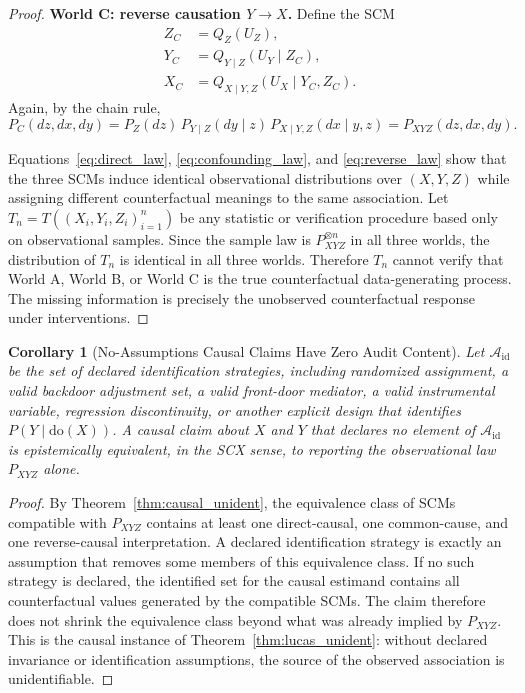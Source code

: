 \documentclass[11pt,a4paper]{article}
\newtheorem{corollary}[theorem]{Corollary}
\theoremstyle{definition}
\begin{document}
\begin{proof}
\medskip\noindent
\textbf{World C: reverse causation $Y \to X$.}
Define the SCM
\begin{align}
    Z_C &= Q_Z(U_Z), \nonumber\\
    Y_C &= Q_{Y\mid Z}(U_Y \mid Z_C), \nonumber\\
    X_C &= Q_{X\mid Y,Z}(U_X \mid Y_C,Z_C).
    \label{eq:scm_reverse}
\end{align}
Again, by the chain rule,
\begin{equation}
    P_C(dz,dx,dy)
    = P_Z(dz)\,P_{Y\mid Z}(dy\mid z)\,P_{X\mid Y,Z}(dx\mid y,z)
    = P_{XYZ}(dz,dx,dy).
    \label{eq:reverse_law}
\end{equation}

Equations~\eqref{eq:direct_law}, \eqref{eq:confounding_law}, and
\eqref{eq:reverse_law} show that the three SCMs induce identical
observational distributions over $(X,Y,Z)$ while assigning different
counterfactual meanings to the same association.  Let
$T_n = T((X_i,Y_i,Z_i)_{i=1}^n)$ be any statistic or verification
procedure based only on observational samples.  Since the sample law is
$P_{XYZ}^{\otimes n}$ in all three worlds, the distribution of $T_n$ is
identical in all three worlds.  Therefore $T_n$ cannot verify that World A,
World B, or World C is the true counterfactual data-generating process.
The missing information is precisely the unobserved counterfactual
response under interventions.
\end{proof}

\begin{corollary}[No-Assumptions Causal Claims Have Zero Audit Content]
\label{cor:no_assumption_causal_claim}
Let $\mathcal{A}_{\mathrm{id}}$ be the set of declared identification
strategies, including randomized assignment, a valid backdoor adjustment
set, a valid front-door mediator, a valid instrumental variable, regression
discontinuity, or another explicit design that identifies
$P(Y\mid \mathrm{do}(X))$.  A causal claim about $X$ and $Y$ that declares no element
of $\mathcal{A}_{\mathrm{id}}$ is epistemically equivalent, in the SCX sense,
to reporting the observational law $P_{XYZ}$ alone.
\end{corollary}

\begin{proof}
By Theorem~\ref{thm:causal_unident}, the equivalence class of SCMs compatible
with $P_{XYZ}$ contains at least one direct-causal, one common-cause, and one
reverse-causal interpretation.  A declared identification strategy is exactly
an assumption that removes some members of this equivalence class.  If no such
strategy is declared, the identified set for the causal estimand contains all
counterfactual values generated by the compatible SCMs.  The claim therefore
does not shrink the equivalence class beyond what was already implied by
$P_{XYZ}$.  This is the causal instance of Theorem~\ref{thm:lucas_unident}:
without declared invariance or identification assumptions, the source of the
observed association is unidentifiable.
\end{proof}
\end{document}
